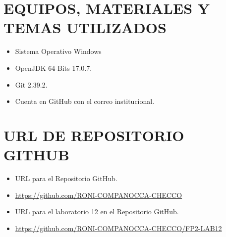 \documentclass{article}
\begin{document}
    \section{EQUIPOS, MATERIALES Y TEMAS UTILIZADOS}
	\begin{itemize}
		\item Sistema Operativo Windows
		\item OpenJDK 64-Bits 17.0.7.
		\item Git 2.39.2.	
  	\item Cuenta en GitHub con el correo institucional.
	\end{itemize}

    \section{URL DE REPOSITORIO GITHUB}
	\begin{itemize}
		\item URL para el Repositorio GitHub.
		\item \url{https://github.com/RONI-COMPANOCCA-CHECCO}
		\item URL para el laboratorio 12 en el Repositorio GitHub.	
        \item \url{https://github.com/RONI-COMPANOCCA-CHECCO/FP2-LAB12}
	\end{itemize}
    
\end{document}
